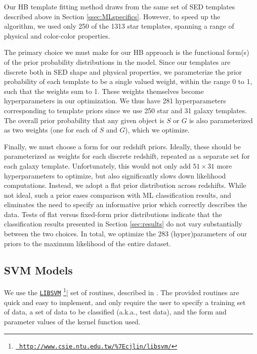 \documentclass[12pt,preprint]{aastex}
\begin{document}
Our HB template fitting method draws from the same set of SED
templates described above in Section \ref{ssec:MLspecifics}.  However,
to speed up the algorithm, we used only 250 of the 1313 star
templates, spanning a range of physical and color-color properties.

The primary choice we must make for our HB approach is the functional
form(s) of the prior probability distributions in the model.  Since
our templates are discrete both in SED shape and physical properties,
we parameterize the prior probability of each template to be a single
valued weight, within the range 0 to 1, such that the weights sum to
1.  These weights themselves become hyperparameters in our
optimization.  We thus have 281 hyperparameters corresponding to
template priors since we use 250 star and 31 galaxy templates.  The
overall prior probability that any given object is $S$ or $G$ is also
parameterized as two weights (one for each of $S$ and $G$), which we
optimize.

Finally, we must choose a form for our redshift priors.  Ideally,
these should be parameterized as weights for each discrete redshift,
repeated as a separate set for each galaxy template.  Unfortunately,
this would not only add $51\times31$ more hyperparameters to optimize,
but also significantly slows down likelihood computations.  Instead,
we adopt a flat prior distribution across redshifts.  While not ideal,
such a prior eases comparison with ML classification results, and
eliminates the need to specify an informative prior which correctly
describes the data.  Tests of flat versus fixed-form prior
distributions indicate that the classification results presented in
Section \ref{sec:results} do not vary substantially between the two
choices.  In total, we optimize the 283 (hyper)parameters of our
priors to the maximum likelihood of the entire dataset.

\subsection{SVM Models}

We use the
\href{http://www.csie.ntu.edu.tw/\%7Ecjlin/libsvm/}{\texttt{LIBSVM}}
\footnote{\href{http://www.csie.ntu.edu.tw/\%7Ecjlin/libsvm/} {\tt
    http://www.csie.ntu.edu.tw/\%7Ecjlin/libsvm/}}| set of routines,
described in \citet{chang11a}.  The provided routines are quick and
easy to implement, and only require the user to specify a training set
of data, a set of data to be classified (a.k.a., test data), and the form 
and parameter values of the kernel function used.  
\end{document}
